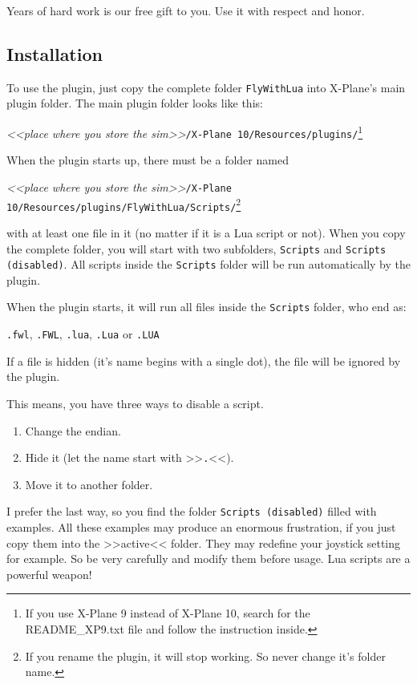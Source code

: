 \documentclass[11pt,parskip=half,a4paper]{scrartcl}
\begin{document}
Years of hard work is our free gift to you. Use it with respect and honor.

\newpage
\subsection{Installation}

To use the plugin, just copy the complete folder \verb|FlyWithLua| into X-Plane's main plugin folder. The main plugin folder looks like this:

\emph{<<place where you store the sim>>}\verb|/X-Plane 10/Resources/plugins/|\footnote{If you use X-Plane 9 instead of X-Plane 10, search for the README\_XP9.txt file and follow the instruction inside.}

When the plugin starts up, there must be a folder named

\emph{<<place where you store the sim>>}\verb|/X-Plane 10/Resources/plugins/FlyWithLua/Scripts/|\footnote{If you rename the plugin, it will stop working. So never change it's folder name.}

with at least one file in it (no matter if it is a Lua script or not). When you copy the complete folder, you will start with two subfolders, \verb|Scripts| and \verb|Scripts (disabled)|. All scripts inside the \verb|Scripts| folder will be run automatically by the plugin.

When the plugin starts, it will run all files inside the \verb|Scripts| folder, who end as:

\verb|.fwl|, \verb|.FWL|, \verb|.lua|, \verb|.Lua| or \verb|.LUA|

If a file is hidden (it's name begins with a single dot), the file will be ignored by the plugin.

This means, you have three ways to disable a script.

\begin{enumerate}
\item Change the endian.
\item Hide it (let the name start with >>\verb|.|<<).
\item Move it to another folder.
\end{enumerate}

I prefer the last way, so you find the folder \verb|Scripts (disabled)| filled with examples. All these examples may produce an enormous frustration, if you just copy them into the >>active<< folder. They may redefine your joystick setting for example. So be very carefully and modify them before usage. Lua scripts are a powerful weapon!
\end{document}
